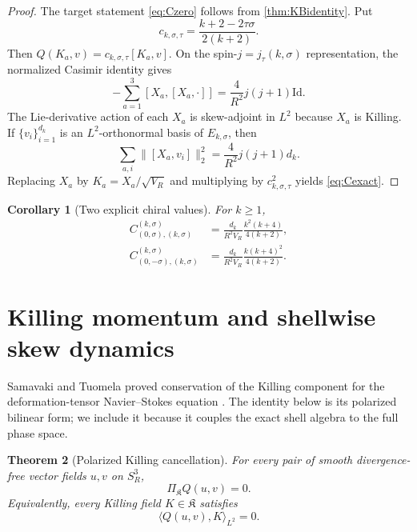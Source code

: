 \documentclass[
 aps,
 prd,
 reprint,
 amsmath,
 amssymb,
 nofootinbib,
 superscriptaddress
]{revtex4-2}
\newtheorem{theorem}{Theorem}[section]
\newtheorem{corollary}[theorem]{Corollary}
\theoremstyle{definition}
\theoremstyle{remark}
\newcommand{\Sthree}{S^3_R}
\newcommand{\cK}{\mathfrak K}
\newcommand{\Id}{\mathrm{Id}}
\begin{document}
\begin{proof}
The target statement \eqref{eq:Czero} follows from
\cref{thm:KBidentity}.  Put
\[
 c_{k,\sigma,\tau}
 =
 \frac{k+2-2\tau\sigma}{2(k+2)}.
\]
Then $Q(K_a,v)=c_{k,\sigma,\tau}[K_a,v]$.
On the spin-$j=j_\tau(k,\sigma)$ representation, the normalized Casimir
identity gives
\[
 -\sum_{a=1}^3 [X_a,[X_a,\cdot]]
 =
 \frac{4}{R^2}j(j+1)\Id.
\]
The Lie-derivative action of each $X_a$ is skew-adjoint in $L^2$ because
$X_a$ is Killing.  If $\{v_i\}_{i=1}^{d_k}$ is an $L^2$-orthonormal basis
of $E_{k,\sigma}$, then
\[
 \sum_{a,i}\|[X_a,v_i]\|_2^2
 =
 \frac{4}{R^2}j(j+1)d_k.
\]
Replacing $X_a$ by $K_a=X_a/\sqrt{V_R}$ and multiplying by
$c_{k,\sigma,\tau}^2$ yields \eqref{eq:Cexact}.
\end{proof}

\begin{corollary}[Two explicit chiral values]
For $k\ge1$,
\begin{align}
 C_{(0,\sigma),(k,\sigma)}^{(k,\sigma)}
 &=
 \frac{d_k}{R^2V_R}
 \frac{k^2(k+4)}{4(k+2)},
 \label{eq:Csame}\\
 C_{(0,-\sigma),(k,\sigma)}^{(k,\sigma)}
 &=
 \frac{d_k}{R^2V_R}
 \frac{k(k+4)^2}{4(k+2)}.
 \label{eq:Copp}
\end{align}
\end{corollary}




\section{Killing momentum and shellwise skew dynamics}
\label{sec:zero-backreaction}

Samavaki and Tuomela proved conservation of the Killing component for
the deformation-tensor Navier--Stokes equation
\cite{SamavakiTuomela2020}. The identity below is its polarized bilinear
form; we include it because it couples the exact shell algebra to the full
phase space.

\begin{theorem}[Polarized Killing cancellation]
\label{thm:zeroback}
For every pair of smooth divergence-free vector fields $u,v$ on $\Sthree$,
\begin{equation}
 \boxed{
 \Pi_{\cK}Q(u,v)=0.
 }
 \label{eq:zeroback}
\end{equation}
Equivalently, every Killing field $K\in\cK$ satisfies
\begin{equation}
 \langle Q(u,v),K\rangle_{L^2}=0.
 \label{eq:zerobackweak}
\end{equation}
\end{theorem}
\end{document}
